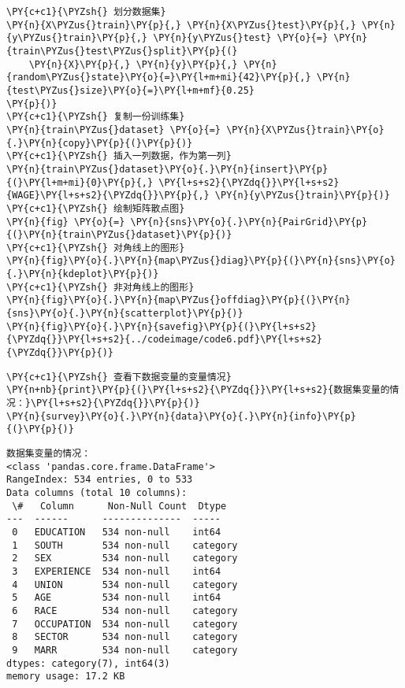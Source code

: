 \begin{Verbatim}[commandchars=\\\{\}]
\PY{c+c1}{\PYZsh{} 划分数据集}
\PY{n}{X\PYZus{}train}\PY{p}{,} \PY{n}{X\PYZus{}test}\PY{p}{,} \PY{n}{y\PYZus{}train}\PY{p}{,} \PY{n}{y\PYZus{}test} \PY{o}{=} \PY{n}{train\PYZus{}test\PYZus{}split}\PY{p}{(}
    \PY{n}{X}\PY{p}{,} \PY{n}{y}\PY{p}{,} \PY{n}{random\PYZus{}state}\PY{o}{=}\PY{l+m+mi}{42}\PY{p}{,} \PY{n}{test\PYZus{}size}\PY{o}{=}\PY{l+m+mf}{0.25}
\PY{p}{)}
\PY{c+c1}{\PYZsh{} 复制一份训练集}
\PY{n}{train\PYZus{}dataset} \PY{o}{=} \PY{n}{X\PYZus{}train}\PY{o}{.}\PY{n}{copy}\PY{p}{(}\PY{p}{)}
\PY{c+c1}{\PYZsh{} 插入一列数据，作为第一列}
\PY{n}{train\PYZus{}dataset}\PY{o}{.}\PY{n}{insert}\PY{p}{(}\PY{l+m+mi}{0}\PY{p}{,} \PY{l+s+s2}{\PYZdq{}}\PY{l+s+s2}{WAGE}\PY{l+s+s2}{\PYZdq{}}\PY{p}{,} \PY{n}{y\PYZus{}train}\PY{p}{)}
\PY{c+c1}{\PYZsh{} 绘制矩阵散点图}
\PY{n}{fig} \PY{o}{=} \PY{n}{sns}\PY{o}{.}\PY{n}{PairGrid}\PY{p}{(}\PY{n}{train\PYZus{}dataset}\PY{p}{)}
\PY{c+c1}{\PYZsh{} 对角线上的图形}
\PY{n}{fig}\PY{o}{.}\PY{n}{map\PYZus{}diag}\PY{p}{(}\PY{n}{sns}\PY{o}{.}\PY{n}{kdeplot}\PY{p}{)}
\PY{c+c1}{\PYZsh{} 非对角线上的图形}
\PY{n}{fig}\PY{o}{.}\PY{n}{map\PYZus{}offdiag}\PY{p}{(}\PY{n}{sns}\PY{o}{.}\PY{n}{scatterplot}\PY{p}{)}
\PY{n}{fig}\PY{o}{.}\PY{n}{savefig}\PY{p}{(}\PY{l+s+s2}{\PYZdq{}}\PY{l+s+s2}{../codeimage/code6.pdf}\PY{l+s+s2}{\PYZdq{}}\PY{p}{)}
\end{Verbatim}

\begin{Verbatim}[commandchars=\\\{\}]
\PY{c+c1}{\PYZsh{} 查看下数据变量的变量情况}
\PY{n+nb}{print}\PY{p}{(}\PY{l+s+s2}{\PYZdq{}}\PY{l+s+s2}{数据集变量的情况：}\PY{l+s+s2}{\PYZdq{}}\PY{p}{)}
\PY{n}{survey}\PY{o}{.}\PY{n}{data}\PY{o}{.}\PY{n}{info}\PY{p}{(}\PY{p}{)}
\end{Verbatim}

\begin{Verbatim}[commandchars=\\\{\}]
数据集变量的情况：
<class 'pandas.core.frame.DataFrame'>
RangeIndex: 534 entries, 0 to 533
Data columns (total 10 columns):
 \#   Column      Non-Null Count  Dtype
---  ------      --------------  -----
 0   EDUCATION   534 non-null    int64
 1   SOUTH       534 non-null    category
 2   SEX         534 non-null    category
 3   EXPERIENCE  534 non-null    int64
 4   UNION       534 non-null    category
 5   AGE         534 non-null    int64
 6   RACE        534 non-null    category
 7   OCCUPATION  534 non-null    category
 8   SECTOR      534 non-null    category
 9   MARR        534 non-null    category
dtypes: category(7), int64(3)
memory usage: 17.2 KB
\end{Verbatim}

